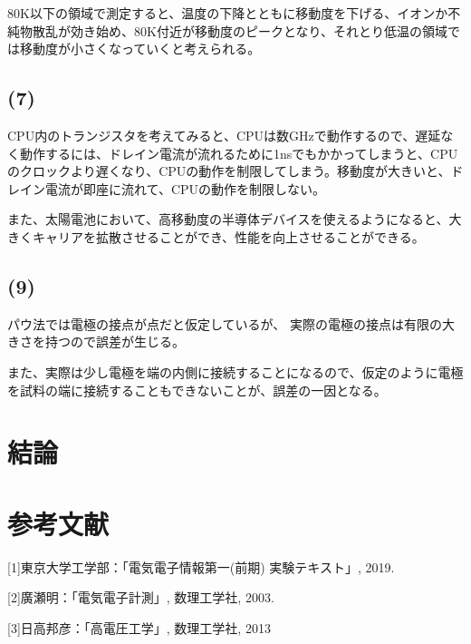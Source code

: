 \documentclass[dvipdfmx]{jsarticle}
\begin{document}
80K以下の領域で測定すると、温度の下降とともに移動度を下げる、イオンか不純物散乱が効き始め、80K付近が移動度のピークとなり、それとり低温の領域では移動度が小さくなっていくと考えられる。

\subsection*{(7)}
CPU内のトランジスタを考えてみると、CPUは数GHzで動作するので、遅延なく動作するには、ドレイン電流が流れるために1nsでもかかってしまうと、CPUのクロックより遅くなり、CPUの動作を制限してしまう。移動度が大きいと、ドレイン電流が即座に流れて、CPUの動作を制限しない。

また、太陽電池において、高移動度の半導体デバイスを使えるようになると、大きくキャリアを拡散させることができ、性能を向上させることができる。

\subsection*{(9)}
パウ法では電極の接点が点だと仮定しているが、
実際の電極の接点は有限の大きさを持つので誤差が生じる。

また、実際は少し電極を端の内側に接続することになるので、仮定のように電極を試料の端に接続することもできないことが、誤差の一因となる。

\section{結論}



\section{参考文献}
[1]東京大学工学部：「電気電子情報第一(前期) 実験テキスト」, 2019.

[2]廣瀬明：「電気電子計測」, 数理工学社, 2003.

[3]日高邦彦：「高電圧工学」, 数理工学社, 2013
\end{document}

